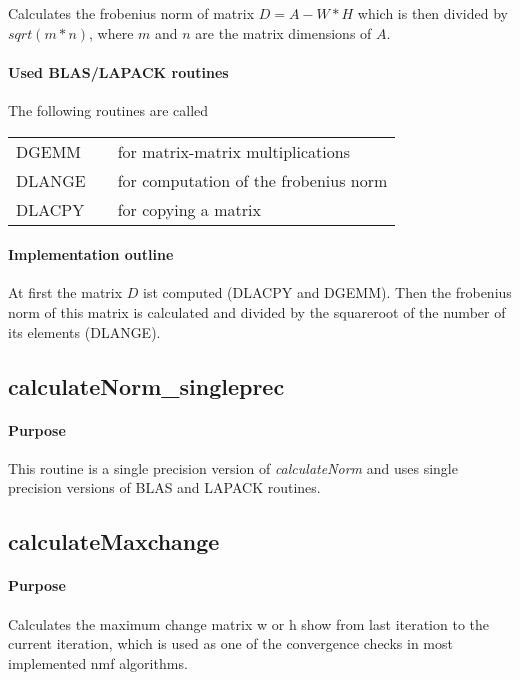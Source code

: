 \documentclass[a4paper,10pt]{scrartcl}
\begin{document}
			Calculates the frobenius norm of matrix $ D = A-W*H$ which is then divided by $sqrt(m*n)$, 
			where $m$ and $n$ are the matrix dimensions of $A$.

			\paragraph{Used BLAS/LAPACK routines}

			The following routines are called\newline

			\begin{tabular}{lcl}
				DGEMM && for matrix-matrix multiplications\\
				DLANGE && for computation of the frobenius norm\\
				DLACPY && for copying a matrix\\
			\end{tabular}

			\paragraph{Implementation outline}

			At first the matrix $D$ ist computed (DLACPY and DGEMM). Then the frobenius norm of this
			matrix is calculated and divided by the squareroot of the number of its elements (DLANGE).


		\subsection{calculateNorm\_singleprec}

			\paragraph{Purpose}

			This routine is a single precision version of \emph{calculateNorm} and uses single precision versions
			of BLAS and LAPACK routines.


		\subsection{calculateMaxchange}


			\paragraph{Purpose}

			Calculates the maximum change matrix w or h show from last iteration to the current 
			iteration, which is used as one of the convergence checks in most implemented nmf algorithms.
\end{document}

